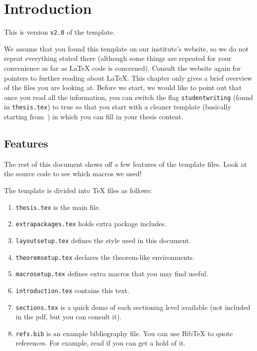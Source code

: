 \newcommand{\package}{\emph}

\chapter{Introduction}

This is version \verb-v2.0- of the template.

We assume that you found this template on our institute's website, so
we do not repeat everything stated there (although some things 
are repeated for your convenience as far as \LaTeX{} code is concerned).
Consult the website again for pointers to further reading about \LaTeX{}.  This chapter only
gives a brief overview of the files you are looking at. Before we start, we would like to point 
out that once you read all the information, you can switch the flag \lstinline|studentwriting| (found in \lstinline|thesis.tex|) to true so that you start with a cleaner template
(basically starting from~) in which you can fill in your thesis content.

\section{Features}
\label{sec:features}

The rest of this document shows off a few features of the template
files.  Look at the source code to see which macros we used!

The template is divided into \TeX{} files as follows:
\begin{enumerate}
\item \texttt{thesis.tex} is the main file.
\item \texttt{extrapackages.tex} holds extra package includes.
\item \texttt{layoutsetup.tex} defines the style used in this document.
\item \texttt{theoremsetup.tex} declares the theorem-like environments.
\item \texttt{macrosetup.tex} defines extra macros that you may find
  useful.
\item \texttt{introduction.tex} contains this text.
\item \texttt{sections.tex} is a quick demo of each sectioning level
  available (not included in the pdf, but you can consult it).
\item \texttt{refs.bib} is an example bibliography file.  You can use
  Bib\TeX{} to quote references.  For example, read
  \cite{bringhurst1996ets} if you can get a hold of it.
\end{enumerate}


